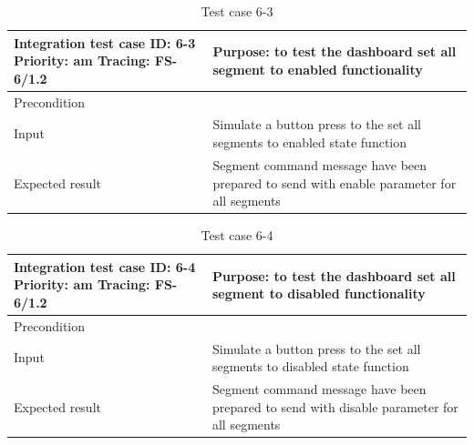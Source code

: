 \begin{table}[H]
	\caption{Test case 6-3}
	\label{table:TCase-FS6-3}
	\begin{center}
		\renewcommand{\arraystretch}{1.8}
		\begin{tabu} 
			to 0.9 \textwidth
			{  X[0.4, c] X[c] }
			\toprule
			Integration test case ID: 6-3 \newline Priority: am \newline Tracing: FS-6/1.2 & Purpose: to test the dashboard set all segment to enabled functionality                      \\ \midrule
			Precondition                                                                   &                                                                                              \\
			Input                                                                          & Simulate a button press to the set all segments to enabled state function                         \\
			Expected result                                                                & Segment command message have been prepared to send with enable parameter for all segments \\ \bottomrule
		\end{tabu}
	\end{center}
\end{table}

\begin{table}[H]
	\caption{Test case 6-4}
	\label{table:TCase-FS6-4}
	\begin{center}
		\renewcommand{\arraystretch}{1.8}
		\begin{tabu} 
			to 0.9 \textwidth
			{  X[0.4, c] X[c] }
			\toprule
			Integration test case ID: 6-4 \newline Priority: am \newline Tracing: FS-6/1.2 & Purpose: to test the dashboard set all segment to disabled functionality                      \\ \midrule
			Precondition                                                                   &                                                                                              \\
			Input                                                                          & Simulate a button press to the set all segments to disabled state function                         \\
			Expected result                                                                & Segment command message have been prepared to send with disable parameter for all segments \\ \bottomrule
		\end{tabu}
	\end{center}
\end{table}


